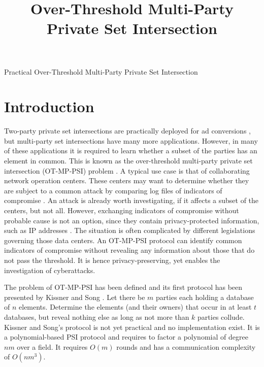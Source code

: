 \documentclass[10pt, sigconf]{acmart}
\title{Over-Threshold Multi-Party Private Set Intersection}
\date{}
\begin{document}
\pagestyle{plain} %
\onecolumn
\begingroup
\centering
{\Huge Practical Over-Threshold Multi-Party Private Set Intersection}\\[3em]
\endgroup

\section{Introduction}

Two-party private set intersections are practically deployed for ad conversions \cite{yung15mental}, but multi-party set intersections have many more applications.
However, in many of these applications it is required to learn whether a subset of the parties has an element in common.
This is known as the over-threshold multi-party private set intersection (OT-MP-PSI) problem \cite{Kissner}.
A typical use case is that of collaborating network operation centers.
These centers may want to determine whether they are subject to a common attack by comparing log files of indicators of compromise \cite{burger2014taxonomy}.
An attack is already worth investigating, if it affects a subset of the centers, but not all.
However, exchanging indicators of compromise without probable cause is not an option, since they contain privacy-protected information, such as IP addresses \cite{lah2008are}.
The situation is often complicated by different legislations governing those data centers.
An OT-MP-PSI protocol can identify common indicators of compromise without revealing any information about those that do not pass the threshold.
It is hence privacy-preserving, yet enables the investigation of cyberattacks.

The problem of OT-MP-PSI has been defined and its first protocol has been presented by Kissner and Song \cite{Kissner}.
Let there be $m$ parties each holding a database of $n$ elements.
Determine the elements (and their owners) that occur in at least $t$ databases, but reveal nothing else as long as not more than $k$ parties collude.
Kissner and Song's protocol is not yet practical and no implementation exist.
It is a polynomial-based PSI protocol and requires to factor a polynomial of degree $nm$ over a field.
It requires $O(m)$ rounds and has a communication complexity of $O(nm^3)$.
\end{document}
